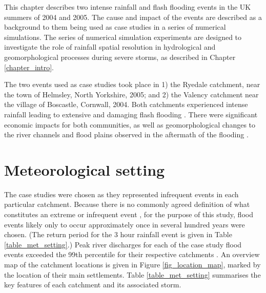 This chapter describes two intense rainfall and flash flooding events in the UK summers of 2004 and 2005. The cause and impact of the events are described as a background to them being used as case studies in a series of numerical simulations. The series of numerical simulation experiments are designed to investigate the role of rainfall spatial resolution in hydrological and geomorphological processes during severe storms, as described in Chapter \ref{chapter_intro}. %

The two events used as case studies took place in 1) the Ryedale catchment, near the town of Helmsley, North Yorkshire, 2005; and  2) the Valency catchment near the village of Boscastle, Cornwall, 2004. Both catchments experienced intense rainfall leading to extensive and damaging flash flooding \citep{golding2005boscastle,sibley2009analysis}. There were significant economic impacts for both communities, as well as geomorphological changes to the river channels and flood plains observed in the aftermath of the flooding \citep{wallingford2005flooding,wass2008investigation}.

\section{Meteorological setting}
The case studies were chosen as they represented infrequent events in each particular catchment. Because there is no commonly agreed definition of what constitutes an extreme or infrequent event \citep[e.g.][]{wilby2008climate,fowler2010detecting,jones2014objective,}, for the purpose of this study, flood events likely only to occur approximately once in several hundred years were chosen. (The return period for the 3 hour rainfall event is given in Table \ref{table_met_setting}.) Peak river discharges for each of the case study flood events exceeded the 99th percentile for their respective catchments \citep{hannaford2004development,NRFA}.  An overview map of the catchment locations is given in Figure \ref{fig_location_map}, marked by the location of their main settlements. Table \ref{table_met_setting} summarises the key features of each catchment and its associated storm.

